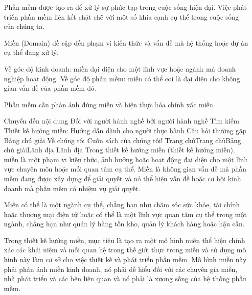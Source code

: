 Phần mềm được tạo ra để xử lý sự phức tạp trong cuộc sống hiện đại. Việc phát triển phần mềm liên kết chặt chẽ với một số khía cạnh cụ thể trong cuộc sống của chúng ta.

Miền (Domain) đề cập đến phạm vi kiến thức và vấn đề mà hệ thống hoặc dự án cụ thể đang xử lý.

Về góc độ kinh doanh: miền đại diện cho một lĩnh vực hoặc ngành mà doanh nghiệp hoạt động.
Về góc độ phần mềm: miền có thể coi là đại diện cho không gian vấn đề của phần mềm đó.

Phần mềm cần phản ánh đúng miền và hiện thực hóa chính xác miền.




Chuyển đến nội dung
Đối với người hành nghề bởi người hành nghề
Tìm kiếm
Thiết kế hướng miền: Hướng dẫn dành cho người thực hành
Câu hỏi thường gặp
Bảng chú giải
Về chúng tôi
Cuốn sách của chúng tôi!
Trang chủTrang chủBảng chú giảiLãnh địa
Lãnh địa
Trong thiết kế hướng miền (thiết kế hướng miền), miền là một phạm vi kiến thức, ảnh hưởng hoặc hoạt động đại diện cho một lĩnh vực chuyên môn hoặc mối quan tâm cụ thể. Miền là không gian vấn đề mà phần mềm đang được xây dựng để giải quyết và nó thể hiện vấn đề hoặc cơ hội kinh doanh mà phần mềm có nhiệm vụ giải quyết.

Miền có thể là một ngành cụ thể, chẳng hạn như chăm sóc sức khỏe, tài chính hoặc thương mại điện tử hoặc có thể là một lĩnh vực quan tâm cụ thể trong một ngành, chẳng hạn như quản lý hàng tồn kho, quản lý khách hàng hoặc hậu cần.

Trong thiết kế hướng miền, mục tiêu là tạo ra một mô hình miền thể hiện chính xác các khái niệm và mối quan hệ trong thế giới thực trong miền và sử dụng mô hình này làm cơ sở cho việc thiết kế và phát triển phần mềm. Mô hình miền này phải phản ánh miền kinh doanh, nó phải dễ hiểu đối với các chuyên gia miền, nhà phát triển và các bên liên quan và nó phải là xương sống của hệ thống phần mềm.

